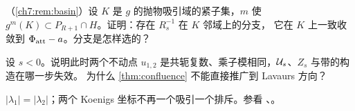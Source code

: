 \begin{exercise}\label{ch7:ex:general-compact}
（\cref{ch7:rem:basin}）设 $K$ 是 $g$ 的抛物吸引域的紧子集，$m$ 使 $g^m(K)\subset P_{R+1}\cap H$。证明：存在 $R_s^{-1}$ 在 $K$ 邻域上的分支，
它在 $K$ 上一致收敛到 $\Phi_{\mathrm{att}}-a$。分支是怎样选的？
\end{exercise}

\begin{exercise}\label{ch7:ex:lavaurs}
设 $s<0$。说明此时两个不动点 $u_{1,2}$ 是共轭复数、乘子模相同，$\mathcal U_s$、$Z_s$ 与带的构造在哪一步失效。
为什么 \cref{thm:confluence} 不能直接推广到 Lavaurs 方向？
\end{exercise}
\begin{hint}
$|\lambda_1|=|\lambda_2|$；两个 Koenigs 坐标不再一个吸引一个排斥。参看 \cite{Lavaurs1989}、\cite{Shishikura2000}。
\end{hint}
